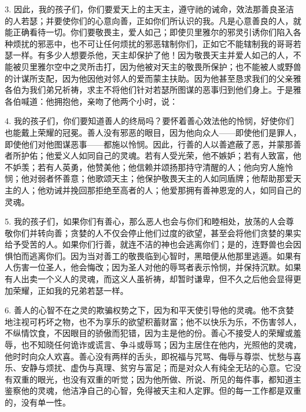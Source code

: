 3. 因此，我的孩子们，你们要爱天上的主天主，遵守祂的诫命，效法那善良圣洁的人若瑟；并要使你们的心意向善，正如你们所认识的我。凡是心意善良的人，就能正确看待一切。你们要敬畏主，爱人如己；即使贝里雅尔的邪灵引诱你们陷入各种烦扰的邪恶中，也不可让任何烦扰的邪恶辖制你们，正如它不能辖制我的哥哥若瑟一样。有多少人想要杀他，天主却保护了他！因为敬畏天主并爱人如己的人，不能被贝里雅尔空中之灵所击打，因为他被对天主的敬畏所保护；也不能被人或野兽的计谋所支配，因为他因他对邻人的爱而蒙主扶助。因为他甚至恳求我们的父亲雅各伯为我们弟兄祈祷，求主不将他们针对若瑟所图谋的恶事归到他们身上。于是雅各伯喊道：他拥抱他，亲吻了他两个小时，说：\par

4. 我的孩子们，你们要知道善人的终局吗？要怀着善心效法他的怜悯，好使你们也能戴上荣耀的冠冕。善人没有邪恶的眼目，因为他向众人——即使他们是罪人，即使他们对他图谋恶事——都施以怜悯。因此，行善的人以善遮蔽了恶，并蒙那善者所护佑；他爱义人如同自己的灵魂。若有人受光荣，他不嫉妒；若有人致富，他不妒羡；若有人英勇，他赞美他；他信赖并颂扬那持守清醒的人；他向穷人施怜悯；他对弱者怀善意；他歌颂天主；他保护敬畏天主的人如同盾牌；他帮助那爱天主的人；他劝诫并挽回那拒绝至高者的人；他爱那拥有善神恩宠的人，如同自己的灵魂。\par

5. 我的孩子们，如果你们有善心，那么恶人也会与你们和睦相处，放荡的人会尊敬你们并转向善；贪婪的人不仅会停止他们过度的欲望，甚至会将他们贪婪的果实给予受苦的人。如果你们行善，就连不洁的神也会逃离你们；是的，连野兽也会因惧怕而逃离你们。因为当对善工的敬畏临到心智时，黑暗便从他那里逃遁。如果有人伤害一位圣人，他会悔改；因为圣人对他的辱骂者表示怜悯，并保持沉默。如果有人出卖一个义人的灵魂，而这义人虽祈祷，却暂时谦卑，但不久之后他会显得更加荣耀，正如我的兄弟若瑟一样。\par

6. 善人的心智不在之灵的欺骗权势之下，因为和平天使引导他的灵魂。他不贪婪地注视可朽坏之物，也不为享乐的欲望积蓄财富；他不以快乐为乐，不伤害邻人，不纵情饮食，不因眼目的骄傲而犯错，因为主是他的份。善心不接受人的荣耀或羞辱，也不知晓任何诡诈或谎言、争斗或辱骂；因为主居住在他内，光照他的灵魂，他时时向众人欢喜。善心没有两样的舌头，即祝福与咒骂、侮辱与尊崇、忧愁与喜乐、安静与烦扰、虚伪与真理、贫穷与富足；而是对众人有纯全无玷的心意。它没有双重的眼光，也没有双重的听觉；因为他所做、所说、所见的每件事，都知道主鉴察他的灵魂，他洁净自己的心智，免得被天主和人定罪。但的每一工作都是双重的，没有单一性。\par

